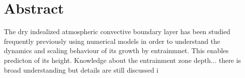 
\chapter{Abstract}
The dry indealized atmospheric convective boundary layer has been studied frequently previously using numerical models in order to understand the dynamics and scaling behaviour of its growth by entrainmnet.  This enables predicton of its height.  Knowledge about the entrainment zone depth...
there is broad understanding but details are still discussed
i 



